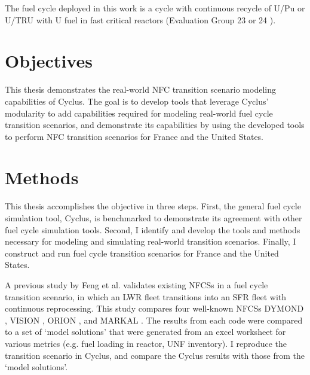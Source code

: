 The fuel cycle deployed in this work is a cycle with
continuous recycle of U/Pu or U/TRU with U fuel in fast critical reactors
(Evaluation Group 23 or 24 \cite{wigeland_nuclear_2014}).

\section{Objectives}

This thesis demonstrates the real-world \gls{NFC} transition
scenario modeling capabilities of Cyclus. The goal is to
develop tools that leverage Cyclus' modularity to
add capabilities required for modeling real-world
fuel cycle transition scenarios, and demonstrate its
capabilities by using the developed tools to perform
\gls{NFC} transition scenarios for France and the United
States.

\section{Methods}
This thesis accomplishes the objective in three steps. First,
the general fuel cycle simulation tool, Cyclus, is benchmarked
to demonstrate its agreement with other fuel cycle simulation
tools. Second, I identify and develop the tools and methods necessary
for modeling and simulating real-world transition scenarios.
Finally, I construct and run fuel cycle transition scenarios
for France and the United States.

A previous study by Feng et al. \cite{feng_standardized_2016} validates existing 
\glspl{NFCS} in a fuel cycle transition scenario, in which an \gls{LWR} fleet
transitions into an \gls{SFR} fleet with continuous reprocessing. This 
study compares four well-known \glspl{NFCS}
DYMOND \cite{yacout_modeling_2005},
VISION \cite{jacobson_verifiable_2010},
ORION \cite{gregg_analysis_2012}, and
MARKAL \cite{shay_epa_2006}. The results from each code were
compared to a set of `model solutions' that were generated
from an excel worksheet for various metrics (e.g. fuel loading
in reactor, \gls{UNF} inventory). I reproduce the transition
scenario in Cyclus, and compare the Cyclus results with those
from the `model solutions'.

